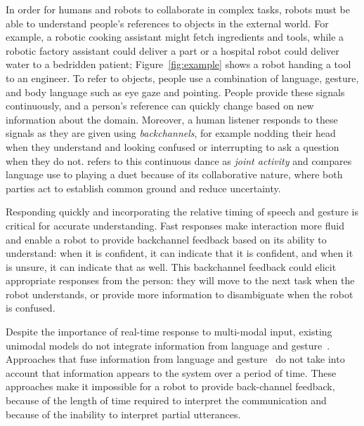 \documentclass[letterpaper, 10 pt, conference]{ieeeconf}
\begin{document}
In order for humans and robots to collaborate in complex tasks, robots
must be able to understand people's references to objects in the
external world.  For example, a robotic cooking assistant might fetch
ingredients and tools, while a robotic factory assistant could deliver
a part or a hospital robot could deliver water to a bedridden patient;
Figure~\ref{fig:example} shows a robot handing a tool to an engineer.
To refer to objects, people use a combination of language, gesture,
and body language such as eye gaze and pointing.  People provide these
signals continuously, and a person's reference can quickly change
based on new information about the domain.  Moreover, a human listener
responds to these signals as they are given using {\em backchannels},
for example nodding their head when they understand and looking
confused or interrupting to ask a question when they do not.
\citet{clark96} refers to this continuous dance as {\em joint
  activity} and compares language use to playing a duet because of its
collaborative nature, where both parties act to establish common
ground and reduce uncertainty.  

Responding quickly and incorporating the relative timing of speech and
gesture is critical for accurate understanding.  Fast responses make
interaction more fluid and enable a robot to provide backchannel
feedback based on its ability to understand: when it is confident, it
can indicate that it is confident, and when it is unsure, it can
indicate that as well.  This backchannel feedback could elicit
appropriate responses from the person: they will move to the next task
when the robot understands, or provide more information to
disambiguate when the robot is confused.


Despite the importance of real-time response to multi-modal input,
existing unimodal models do not integrate information from language
and gesture~\citep{matuszek14, tellex11, kollar10}.  Approaches that
fuse information from language and gesture~\citep{matuszek14} do not
take into account that information appears to the system over a period
of time.  These approaches make it impossible for a robot to provide
back-channel feedback, because of the length of time required to
interpret the communication and because of the inability to interpret
partial utterances.
\end{document}
